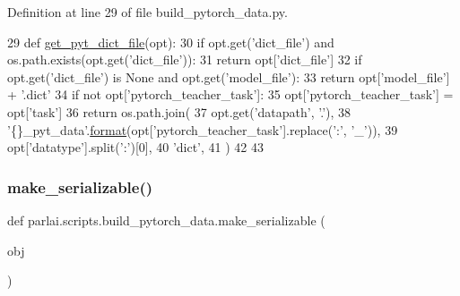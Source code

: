 Definition at line 29 of file build\+\_\+pytorch\+\_\+data.\+py.


\begin{DoxyCode}
29 \textcolor{keyword}{def }\hyperlink{namespaceparlai_1_1scripts_1_1build__pytorch__data_a6ec85a5842150af78f5178d75075b0cc}{get\_pyt\_dict\_file}(opt):
30     \textcolor{keywordflow}{if} opt.get(\textcolor{stringliteral}{'dict\_file'}) \textcolor{keywordflow}{and} os.path.exists(opt.get(\textcolor{stringliteral}{'dict\_file'})):
31         \textcolor{keywordflow}{return} opt[\textcolor{stringliteral}{'dict\_file'}]
32     \textcolor{keywordflow}{if} opt.get(\textcolor{stringliteral}{'dict\_file'}) \textcolor{keywordflow}{is} \textcolor{keywordtype}{None} \textcolor{keywordflow}{and} opt.get(\textcolor{stringliteral}{'model\_file'}):
33         \textcolor{keywordflow}{return} opt[\textcolor{stringliteral}{'model\_file'}] + \textcolor{stringliteral}{'.dict'}
34     \textcolor{keywordflow}{if} \textcolor{keywordflow}{not} opt[\textcolor{stringliteral}{'pytorch\_teacher\_task'}]:
35         opt[\textcolor{stringliteral}{'pytorch\_teacher\_task'}] = opt[\textcolor{stringliteral}{'task'}]
36     \textcolor{keywordflow}{return} os.path.join(
37         opt.get(\textcolor{stringliteral}{'datapath'}, \textcolor{stringliteral}{'.'}),
38         \textcolor{stringliteral}{'\{\}\_pyt\_data'}.\hyperlink{namespaceparlai_1_1chat__service_1_1services_1_1messenger_1_1shared__utils_a32e2e2022b824fbaf80c747160b52a76}{format}(opt[\textcolor{stringliteral}{'pytorch\_teacher\_task'}].replace(\textcolor{stringliteral}{':'}, \textcolor{stringliteral}{'\_'})),
39         opt[\textcolor{stringliteral}{'datatype'}].split(\textcolor{stringliteral}{':'})[0],
40         \textcolor{stringliteral}{'dict'},
41     )
42 
43 
\end{DoxyCode}
\mbox{\label{namespaceparlai_1_1scripts_1_1build__pytorch__data_a1c8f4633b7dc8e990a3e1f6c3e92bd3f}} 
\subsubsection{\texorpdfstring{make\+\_\+serializable()}{make\_serializable()}}
{\footnotesize\ttfamily def parlai.\+scripts.\+build\+\_\+pytorch\+\_\+data.\+make\+\_\+serializable (\begin{DoxyParamCaption}\item[{}]{obj }\end{DoxyParamCaption})}



